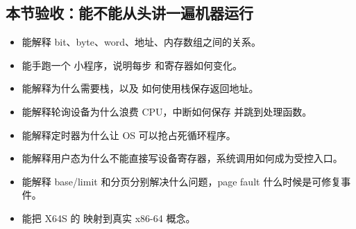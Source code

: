 \subsection{本节验收：能不能从头讲一遍机器运行}

\begin{rubricbox}
\begin{itemize}
\tightlist
\item 能解释 bit、byte、word、地址、内存数组之间的关系。
\item 能手跑一个  小程序，说明每步  和寄存器如何变化。
\item 能解释为什么需要栈，以及  如何使用栈保存返回地址。
\item 能解释轮询设备为什么浪费 CPU，中断如何保存  并跳到处理函数。
\item 能解释定时器为什么让 OS 可以抢占死循环程序。
\item 能解释用户态为什么不能直接写设备寄存器，系统调用如何成为受控入口。
\item 能解释 base/limit 和分页分别解决什么问题，page fault 什么时候是可修复事件。
\item 能把 X64S 的  映射到真实 x86-64 概念。
\end{itemize}
\end{rubricbox}
